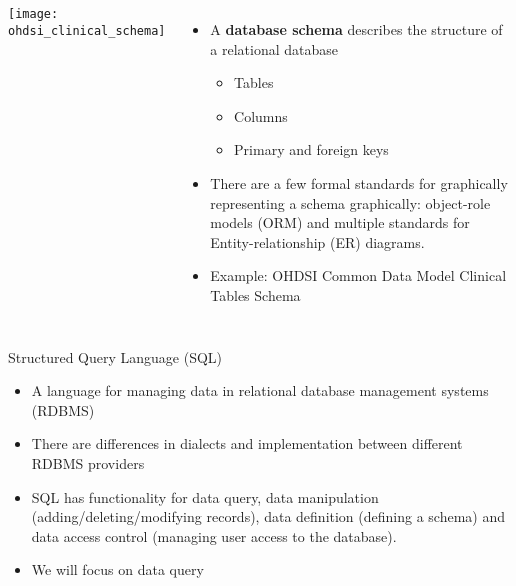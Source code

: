 \documentclass[aspectratio=169]{beamer}
\begin{document}
	\begin{frame}
		
		\begin{columns}
				\texttt{[image: ohdsi\_clinical\_schema]}
			\small
				\begin{itemize}
					\item A \textbf{database schema} describes the structure of a relational database
					\begin{itemize}
						\item Tables
						\item Columns
						\item Primary and foreign keys
					\end{itemize}
					\item There are a few formal standards for graphically representing a schema graphically: object-role models (ORM) and multiple standards for Entity-relationship (ER) diagrams.
					\item Example: OHDSI Common Data Model Clinical Tables Schema
				\end{itemize}
		\end{columns}		
	\end{frame}

	\begin{frame}{Structured Query Language (SQL)}
		
		\begin{itemize}[<+->]
			\item A language for managing data in relational database management systems (RDBMS)
			\item There are differences in dialects and implementation between different RDBMS providers
			\item SQL has functionality for data query, data manipulation (adding/deleting/modifying records), data definition (defining a schema) and data access control (managing user access to the database).
			\item We will focus on data query
		\end{itemize}
	\end{frame}
\end{document}
